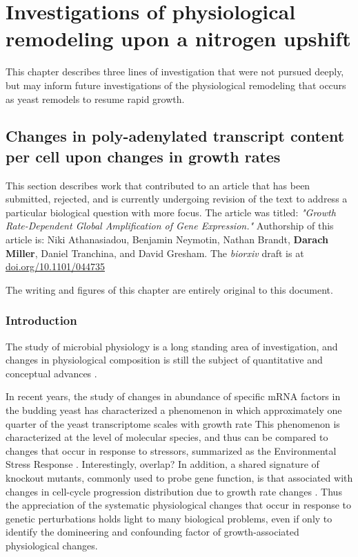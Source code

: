 \chapter{Investigations of physiological remodeling upon a nitrogen 
upshift}

This chapter describes three lines of investigation that were not
pursued deeply, but may inform future investigations of the
physiological remodeling that occurs as yeast remodels to resume rapid
growth.

%
%
%
\section{Changes in poly-adenylated transcript content per cell 
upon changes in growth rates}
%
%
%

This section describes work that contributed to an article that 
has been submitted, rejected, and is currently undergoing revision 
of the text to address a particular biological question with more
focus.
The article was titled:
\textit{"Growth Rate-Dependent Global Amplification of Gene Expression."}
Authorship of this article is: 
Niki Athanasiadou, Benjamin Neymotin, Nathan Brandt, 
\textbf{Darach Miller}, Daniel Tranchina, and David Gresham.
The \textit{biorxiv} draft is at \url{doi.org/10.1101/044735}

The writing and figures of this chapter are entirely original to this 
document.

%
%
%
\subsection{Introduction}
%
%
%

The study of microbial physiology is a long standing area of
investigation, and changes in physiological composition is still the
subject of quantitative and conceptual advances 
\parencite{henrici1928
malooe
waldron?
carter?
nitrogen upshift stuff?
more warner?
scott2010
hwarecent stuff
}.

In recent years, the study of changes in abundance of specific mRNA
factors in the budding yeast has characterized a phenomenon in which
approximately one quarter of the yeast transcriptome scales with
growth rate
\parencite{ Brauer 2008, Regenberg, Castrillo,  Airoldi2009
airoldi2016}
This phenomenon is characterized at the level of molecular species,
and thus can be compared to changes that occur in response to
stressors, summarized as the Environmental Stress Response 
\parencite{gasch2000genomic}.
Interestingly, overlap?
In addition, a shared signature of knockout mutants, commonly used to
probe gene function, is that associated with changes in cell-cycle
progression distribution due to growth rate changes
\parencite{
cell cycle kemmern thing}.
Thus the appreciation of the systematic physiological changes that
occur in response to genetic perturbations holds light to many
biological problems, even if only to identify the domineering and 
confounding factor of growth-associated physiological changes.

